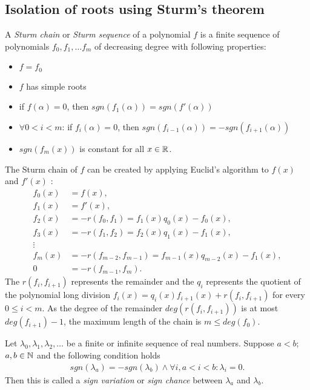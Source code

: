 \documentclass[
  digital, %
  notable,   %
  nolof,     %
  nolot,     %
	final, %
]{fithesis3}
\begin{document}
\subsection{Isolation of roots using Sturm's theorem}
\begin{definition}
A \textit{Sturm chain} or \textit{Sturm sequence} of a polynomial $f$ is a finite sequence of polynomials $f_{0}, f_{1},\ldots f_{m}$ of decreasing degree with following properties:
\begin{itemize}
	\item $f=f_{0}$
  \item $f$ has simple roots
  \item if $f(\alpha)=0$, then $sgn(f_{1}(\alpha))=sgn(f'(\alpha))$
	\item $\forall 0 < i < m$: if $f_{i}(\alpha)=0$, then $sgn(f_{i-1}(\alpha))=-sgn(f_{i+1}(\alpha))$
	\item $sgn(f_{m}(x))$ is constant for all $x\in\mathbb{R}$.
\end{itemize}
\end{definition}
The Sturm chain of $f$ can be created by applying Euclid's algorithm to $f(x)$ and $f'(x)$ \parencite{sturm,vigklasphd}:
\begin{align*}
 f_{0}(x)&=f(x), \\
 f_{1}(x)&=f'(x), \\
 f_{2}(x)&=-r(f_{0},f_{1})=f_{1}(x)q_{0}(x)-f_{0}(x), \\
 f_{3}(x)&=-r(f_{1},f_{2})=f_{2}(x)q_{1}(x)-f_{1}(x), \\
 \vdots \\
 f_{m}(x)&=-r(f_{m-2},f_{m-1})=f_{m-1}(x)q_{m-2}(x)-f_{1}(x), \\
0&=-r(f_{m-1},f_{m}).
\end{align*}
The $r(f_{i},f_{i+1})$ represents the remainder and the $q_{i}$ represents the quotient of the polynomial long division ${f_{i}(x)}=q_{i}(x)f_{i+1}(x)+r(f_{i},f_{i+1})$ for every $0 \leq i < m$. As the degree of the remainder $deg(r(f_{i},f_{i+1}))$ is at most $deg(f_{i+1})-1$, the maximum length of the chain is $m \leq deg(f_{0})$.

\begin{definition}\label{def:signvar}
Let $\lambda_{0}, \lambda_{1}, \lambda_{2},\ldots$ be a finite or infinite sequence of real numbers. Suppose $a < b$; $a, b\in\mathbb{N}$ and the following condition holds
\begin{align}
	sgn(\lambda_{a}) = -sgn(\lambda_{b}) \land \forall i, a < i < b: \lambda_{i} = 0.
\end{align}
Then this is called a \textit{sign variation} or \textit{sign chance} between $\lambda_{a}$ and $\lambda_{b}$.
\end{definition}
\end{document}
